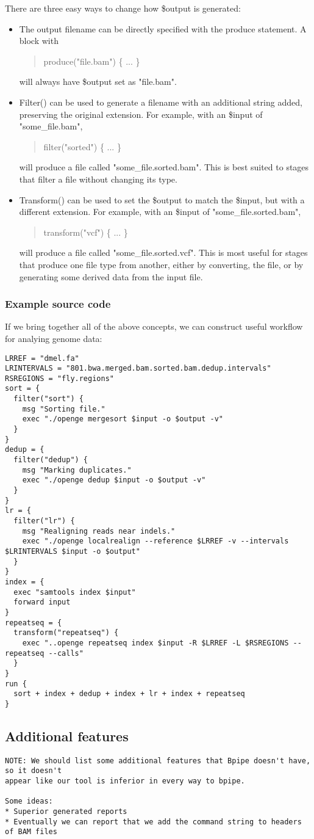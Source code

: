\documentclass[11pt]{article}
\newcommand {\cmd}[1] {\begin{quote}#1\end{quote}}
\begin{document}
There are three easy ways to change how \$output is generated:
\begin{itemize}
\item The output filename can be directly specified with the produce statement. A block with
\cmd{produce("file.bam") \{ ... \} }
will always have \$output set as "file.bam".
\item Filter() can be used to generate a filename with an additional string added, preserving the original extension. For example, with an \$input of "some\_file.bam",
\cmd{filter("sorted") \{ ... \} }
will produce a file called "some\_file.sorted.bam". This is best suited to stages that filter a file without changing its type.
\item Transform() can be used to set the \$output to match the \$input, but with a different extension. For example, with an \$input of "some\_file.sorted.bam",
\cmd{transform("vcf") \{ ... \} }
will produce a file called "some\_file.sorted.vcf". This is most useful for stages that produce one file type from another, either by converting, the file, or by generating some derived data from the input file.
\end{itemize}

\subsubsection{Example source code}
If we bring together all of the above concepts, we can construct useful workflow for analying genome data:
\begin{verbatim}
LRREF = "dmel.fa"
LRINTERVALS = "801.bwa.merged.bam.sorted.bam.dedup.intervals"
RSREGIONS = "fly.regions"
sort = {
  filter("sort") {
    msg "Sorting file."
    exec "./openge mergesort $input -o $output -v"
  }
}
dedup = {
  filter("dedup") {
    msg "Marking duplicates."
    exec "./openge dedup $input -o $output -v"
  }
}
lr = {
  filter("lr") {
    msg "Realigning reads near indels."
    exec "./openge localrealign --reference $LRREF -v --intervals $LRINTERVALS $input -o $output"
  }
}
index = {
  exec "samtools index $input"
  forward input
}
repeatseq = {
  transform("repeatseq") {
    exec "..openge repeatseq index $input -R $LRREF -L $RSREGIONS --repeatseq --calls"
  }
}
run {
  sort + index + dedup + index + lr + index + repeatseq
}
\end{verbatim}

\subsection {Additional features}
\begin{verbatim}
NOTE: We should list some additional features that Bpipe doesn't have, so it doesn't 
appear like our tool is inferior in every way to bpipe.

Some ideas:
* Superior generated reports
* Eventually we can report that we add the command string to headers of BAM files
\end{verbatim}
\end{document}

